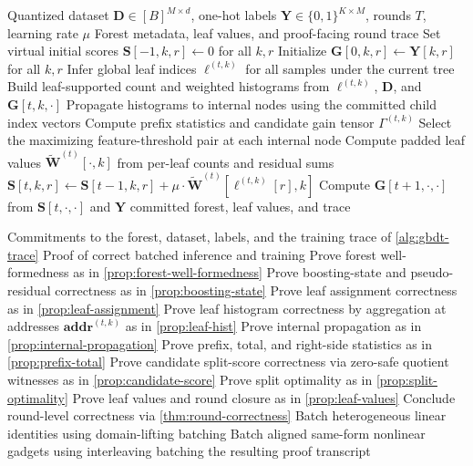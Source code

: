 \begin{algorithm}[H]
\caption{Quantized multi-class GBDT training trace}
\label{alg:gbdt-trace}
\begin{algorithmic}
\Require Quantized dataset $\mathbf{D}\in[B]^{M\times d}$, one-hot labels $\mathbf{Y}\in\{0,1\}^{K\times M}$, rounds $T$, learning rate $\mu$
\Ensure Forest metadata, leaf values, and proof-facing round trace
\State Set virtual initial scores $\mathbf{S}[-1,k,r]\gets 0$ for all $k,r$
\State Initialize $\mathbf{G}[0,k,r]\gets \mathbf{Y}[k,r]$ for all $k,r$
    \State Infer global leaf indices $\boldsymbol{\ell}^{(t,k)}$ for all samples under the current tree
    \State Build leaf-supported count and weighted histograms from $\boldsymbol{\ell}^{(t,k)}$, $\mathbf{D}$, and $\mathbf{G}[t,k,\cdot]$
    \State Propagate histograms to internal nodes using the committed child index vectors
    \State Compute prefix statistics and candidate gain tensor $\Gamma^{(t,k)}$
    \State Select the maximizing feature-threshold pair at each internal node
    \State Compute padded leaf values $\widetilde{\mathbf{W}}^{(t)}[\cdot,k]$ from per-leaf counts and residual sums
  \EndFor
      \State $\mathbf{S}[t,k,r] \gets \mathbf{S}[t-1,k,r] + \mu\cdot \widetilde{\mathbf{W}}^{(t)}[\boldsymbol{\ell}^{(t,k)}[r],k]$
    \EndFor
  \EndFor
    \State Compute $\mathbf{G}[t+1,\cdot,\cdot]$ from $\mathbf{S}[t,\cdot,\cdot]$ and $\mathbf{Y}$
  \EndIf
\EndFor
\State \Return committed forest, leaf values, and trace
\end{algorithmic}
\end{algorithm}

\begin{algorithm}[H]
\caption{Proof generation for quantized ZK-GBDT training}
\label{alg:zkgbdt-proof}
\begin{algorithmic}
\Require Commitments to the forest, dataset, labels, and the training trace of \cref{alg:gbdt-trace}
\Ensure Proof of correct batched inference and training
\State Prove forest well-formedness as in \cref{prop:forest-well-formedness}
  \State Prove boosting-state and pseudo-residual correctness as in \cref{prop:boosting-state}
    \State Prove leaf assignment correctness as in \cref{prop:leaf-assignment}
    \State Prove leaf histogram correctness by aggregation at addresses $\mathbf{addr}^{(t,k)}$ as in \cref{prop:leaf-hist}
    \State Prove internal propagation as in \cref{prop:internal-propagation}
    \State Prove prefix, total, and right-side statistics as in \cref{prop:prefix-total}
    \State Prove candidate split-score correctness via zero-safe quotient witnesses as in \cref{prop:candidate-score}
    \State Prove split optimality as in \cref{prop:split-optimality}
    \State Prove leaf values and round closure as in \cref{prop:leaf-values}
  \EndFor
  \State Conclude round-level correctness via \cref{thm:round-correctness}
\EndFor
\State Batch heterogeneous linear identities using domain-lifting batching
\State Batch aligned same-form nonlinear gadgets using interleaving batching
\State \Return the resulting proof transcript
\end{algorithmic}
\end{algorithm}
